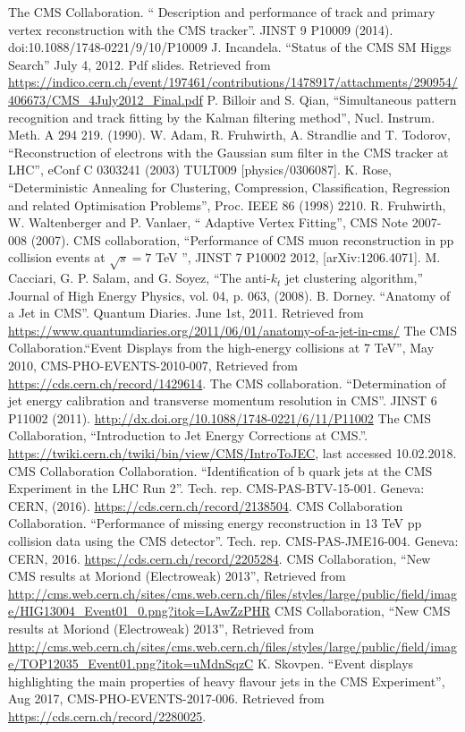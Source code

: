 \documentclass[print]{nuthesis}
\begin{document}
\begin{thebibliography}{300}
 The CMS Collaboration. `` Description and performance of track and primary vertex reconstruction with the CMS tracker''. JINST 9 P10009 (2014). doi:10.1088/1748-0221/9/10/P10009
 J. Incandela. ``Status of the CMS SM Higgs Search'' July 4, 2012. Pdf slides. Retrieved from \url{https://indico.cern.ch/event/197461/contributions/1478917/attachments/290954/406673/CMS_4July2012_Final.pdf}
 P. Billoir and S. Qian, ``Simultaneous pattern recognition and track fitting by the Kalman filtering method'', Nucl. Instrum. Meth. A 294 219. (1990).
 W. Adam, R. Fruhwirth, A. Strandlie and T. Todorov, ``Reconstruction of electrons with the Gaussian sum filter in the CMS tracker at LHC'', eConf C 0303241 (2003) TULT009 [physics/0306087].
 K. Rose,  ``Deterministic Annealing for Clustering, Compression, Classification, Regression and related Optimisation Problems'', Proc. IEEE 86 (1998) 2210.
 R. Fruhwirth, W. Waltenberger and P. Vanlaer, `` Adaptive Vertex Fitting'', CMS Note 2007-008 (2007).
 CMS collaboration, ``Performance of CMS muon reconstruction in pp collision events at $\sqrt{s}= 7$ TeV '', JINST 7 P10002 2012, [arXiv:1206.4071].
 M. Cacciari, G. P. Salam, and G. Soyez, ``The anti-$k_t$ jet clustering algorithm,'' Journal of High Energy Physics, vol. 04, p. 063, (2008).
 B. Dorney. ``Anatomy of a Jet in CMS''. Quantum Diaries. June 1st, 2011.  Retrieved from \url{https://www.quantumdiaries.org/2011/06/01/anatomy-of-a-jet-in-cms/}
 The CMS Collaboration.``Event Displays from the high-energy collisions at 7 TeV'', May 2010, CMS-PHO-EVENTS-2010-007, Retrieved from \url{https://cds.cern.ch/record/1429614}.
 The CMS collaboration. ``Determination of jet energy calibration and transverse momentum resolution in CMS''. JINST 6 P11002 (2011). \url{http://dx.doi.org/10.1088/1748-0221/6/11/P11002}
 The CMS Collaboration, ``Introduction to Jet Energy Corrections at CMS.''. \url{https://twiki.cern.ch/twiki/bin/view/CMS/IntroToJEC}, last accessed 10.02.2018. 
CMS Collaboration Collaboration. ``Identification of b quark jets at the CMS Experiment in the LHC Run 2''. Tech. rep. CMS-PAS-BTV-15-001. Geneva: CERN, (2016). \url{https://cds.cern.ch/record/2138504}.
CMS Collaboration Collaboration. ``Performance of missing energy reconstruction in 13 TeV pp collision data using the CMS detector''. Tech. rep. CMS-PAS-JME16-004. Geneva: CERN, 2016. \url{https://cds.cern.ch/record/2205284}.
CMS Collaboration, ``New CMS results at Moriond (Electroweak) 2013'', Retrieved from \url{http://cms.web.cern.ch/sites/cms.web.cern.ch/files/styles/large/public/field/image/HIG13004\_Event01\_0.png?itok=LAwZzPHR}
 CMS Collaboration, ``New CMS results at Moriond (Electroweak) 2013'', Retrieved from \url{http://cms.web.cern.ch/sites/cms.web.cern.ch/files/styles/large/public/field/image/TOP12035\_Event01.png?itok=uMdnSqzC}
 K. Skovpen. ``Event displays highlighting the main properties of heavy flavour jets in the CMS Experiment'', Aug 2017, CMS-PHO-EVENTS-2017-006. Retrieved from \url{https://cds.cern.ch/record/2280025}.


\end{thebibliography}
\end{document}
